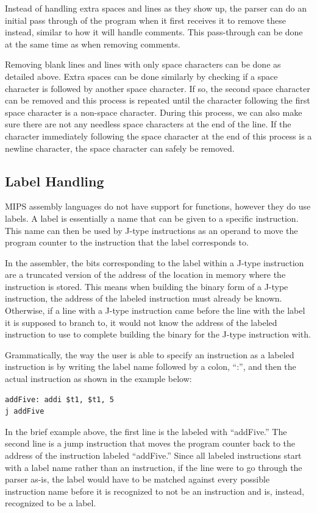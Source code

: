 \documentclass[
    paper=letter,
    parskip=half,
    fontsize=12pt,
    titlepage=firstiscover,
    toc=bibliography,
    numbers=endperiod
]{scrartcl}
\begin{document}
Instead of handling extra spaces and lines as they show up, the parser
can do an initial pass through of the program when it first receives it
to remove these instead, similar to how it will handle comments. This
pass-through can be done at the same time as when removing comments.

Removing blank lines and lines with only space characters can be done as
detailed above. Extra spaces can be done similarly by checking if a
space character is followed by another space character. If so, the
second space character can be removed and this process is repeated until
the character following the first space character is a non-space
character. During this process, we can also make sure there are not any
needless space characters at the end of the line. If the character
immediately following the space character at the end of this process is
a newline character, the space character can safely be removed.

\subsection{Label Handling}

MIPS assembly languages do not have support for functions, however they
do use labels. A label is essentially a name that can be given to a
specific instruction. This name can then be used by J-type instructions
as an operand to move the program counter to the instruction that the
label corresponds to.

In the assembler, the bits corresponding to the label within a J-type
instruction are a truncated version of the address of the location in
memory where the instruction is stored. This means when building
the binary form of a J-type instruction, the address of the labeled
instruction must already be known. Otherwise, if a line with a J-type
instruction came before the line with the label it is supposed to branch
to, it would not know the address of the labeled instruction to use to
complete building the binary for the J-type instruction with.

Grammatically, the way the user is able to specify an instruction as a
labeled instruction is by writing the label name followed by a colon,
``:'', and then the actual instruction as shown in the example below:

\begin{verbatim}
addFive: addi $t1, $t1, 5
j addFive
\end{verbatim}

In the brief example above, the first line is the labeled with
``addFive.'' The second line is a jump instruction that moves the
program counter back to the address of the instruction labeled
``addFive.'' Since all labeled instructions start with a label name
rather than an instruction, if the line were to go through the parser
as-is, the label would have to be matched against every possible
instruction name before it is recognized to not be an instruction and
is, instead, recognized to be a label.
\end{document}
